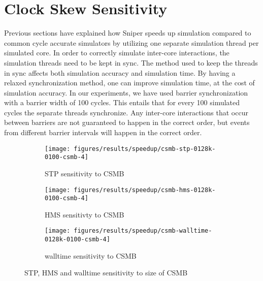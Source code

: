 
\section{Clock Skew Sensitivity}
\label{sec:results:csmb_sensitivity}

Previous sections have explained how Sniper speeds up simulation compared to common cycle accurate simulators by utilizing one separate simulation thread per simulated core.
In order to correctly simulate inter-core interactions, the simulation threads need to be kept in sync.
The method used to keep the threads in sync affects both simulation accuracy and simulation time.
By having a relaxed synchronization method, one can improve simulation time, at the cost of simulation accuracy.
In our experiments, we have used barrier synchronization with a barrier width of 100 cycles.
This entails that for every 100 simulated cycles the separate threads synchronize.
Any inter-core interactions that occur between barriers are not guaranteed to happen in the correct order, but events from different barrier intervals will happen in the correct order.


\begin{figure}
    \centering
    \begin{subfigure}[b]{0.5\textwidth}
        \texttt{[image: figures/results/speedup/csmb-stp-0128k-0100-csmb-4]}
        \caption{STP sensitivity to CSMB}
        \label{fig:results:csmb:stp}
    \end{subfigure}%
    \begin{subfigure}[b]{0.5\textwidth}
        \texttt{[image: figures/results/speedup/csmb-hms-0128k-0100-csmb-4]}
        \caption{HMS sensitivty to CSMB}
        \label{fig:results:csmb:hms}
    \end{subfigure}
    \begin{subfigure}[b]{0.6\textwidth}
        \texttt{[image: figures/results/speedup/csmb-walltime-0128k-0100-csmb-4]}
        \caption{walltime sensitivity to CSMB}
        \label{fig:results:csmb:mpki}
    \end{subfigure}
    \caption{STP, HMS and walltime sensitivity to size of CSMB}
    \label{fig:results:csmb}
\end{figure}



